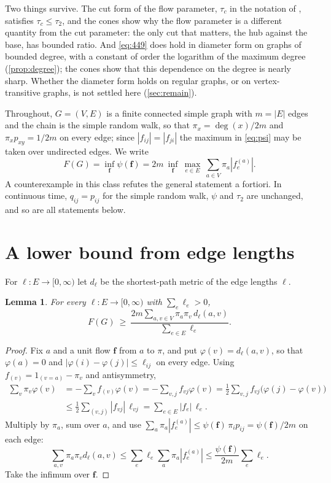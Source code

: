 \documentclass[11pt]{amsart}
\newtheorem{lemma}[theorem]{Lemma}
\theoremstyle{definition}
\newcommand{\bfF}{\mathbf{f}}
\begin{document}
Two things survive. The cut form of the flow parameter, $\tau_c$ in the notation of \cite[Section~4.5]{AF}, satisfies $\tau_c\le\tau_2$, and the cones show why the flow parameter is a different quantity from the cut parameter: the only cut that matters, the hub against the base, has bounded ratio. And \eqref{eq:449} does hold in diameter form on graphs of bounded degree, with a constant of order the logarithm of the maximum degree (\cref{prop:degree}); the cones show that this dependence on the degree is nearly sharp. Whether the diameter form holds on regular graphs, or on vertex-transitive graphs, is not settled here (\cref{sec:remain}).

Throughout, $G=(V,E)$ is a finite connected simple graph with $m=|E|$ edges and the chain is the simple random walk, so that $\pi_x=\deg(x)/2m$ and $\pi_xp_{xy}=1/2m$ on every edge; since $|f_{ij}|=|f_{ji}|$ the maximum in \eqref{eq:psi} may be taken over undirected edges. We write
\begin{equation}\label{eq:F}
F(G)=\inf_{\bfF}\psi(\bfF)=2m\ \inf_{\bfF}\ \max_{e\in E}\ \sum_{a\in V}\pi_a|f^{(a)}_e| .
\end{equation}
A counterexample in this class refutes the general statement a fortiori. In continuous time, $q_{ij}=p_{ij}$ for the simple random walk, $\psi$ and $\tau_2$ are unchanged, and so are all statements below.

\section{A lower bound from edge lengths}

For $\ell:E\to[0,\infty)$ let $d_\ell$ be the shortest-path metric of the edge lengths $\ell$.

\begin{lemma}\label{lem:dual}
For every $\ell:E\to[0,\infty)$ with $\sum_e\ell_e>0$,
\[
F(G)\ \ge\ \frac{2m\sum_{a,v\in V}\pi_a\pi_v\,d_\ell(a,v)}{\sum_{e\in E}\ell_e}.
\]
\end{lemma}

\begin{proof}
Fix $a$ and a unit flow $\bfF$ from $a$ to $\pi$, and put $\varphi(v)=d_\ell(a,v)$, so that $\varphi(a)=0$ and $|\varphi(i)-\varphi(j)|\le\ell_{ij}$ on every edge. Using $f_{(v)}=1_{(v=a)}-\pi_v$ and antisymmetry,
\begin{align*}
\sum_v\pi_v\varphi(v)&=-\sum_vf_{(v)}\varphi(v)=-\sum_{v,j}f_{vj}\varphi(v)=\frac12\sum_{v,j}f_{vj}\bigl(\varphi(j)-\varphi(v)\bigr)\\
&\le\frac12\sum_{(v,j)}|f_{vj}|\,\ell_{vj}=\sum_{e\in E}|f_e|\,\ell_e .
\end{align*}
Multiply by $\pi_a$, sum over $a$, and use $\sum_a\pi_a|f^{(a)}_e|\le\psi(\bfF)\,\pi_ip_{ij}=\psi(\bfF)/2m$ on each edge:
\[
\sum_{a,v}\pi_a\pi_vd_\ell(a,v)\le\sum_e\ell_e\sum_a\pi_a|f^{(a)}_e|\le\frac{\psi(\bfF)}{2m}\sum_e\ell_e .
\]
Take the infimum over $\bfF$.
\end{proof}
\end{document}
